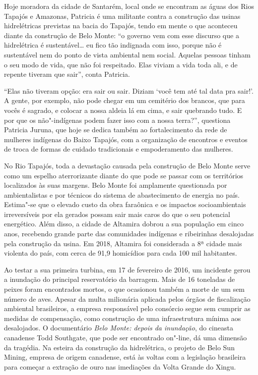 Hoje moradora da cidade de Santarém, local onde se encontram as águas
dos Rios Tapajós e Amazonas, Patricia é uma militante contra a
construção das usinas hidrelétricas previstas na bacia do Tapajós, tendo
em mente o que aconteceu diante da construção de Belo %
Monte: ``o governo vem com esse discurso que a hidrelétrica é
sustentável\ldots{} eu fico tão indignada com isso, porque não é
sustentável nem do ponto de vista ambiental nem social. Aquelas pessoas
tinham o seu modo de vida, que não foi respeitado. Elas viviam a vida
toda ali, e de repente tiveram que sair'', conta Patricia.

``Elas não tiveram opção: era sair ou sair. Diziam `você tem até tal
data pra sair!'. A gente, por exemplo, não pode chegar em um cemitério
dos brancos, que para vocês é sagrado, e colocar a nossa aldeia lá em
cima, e sair quebrando tudo. E por que os não"-indígenas podem fazer isso
com a nossa terra?'', questiona Patricia Juruna, que hoje se dedica também ao
fortalecimento da rede de mulheres indígenas do Baixo Tapajós, com a
organização de encontros e eventos de troca de formas de cuidado
tradicionais e empoderamento das mulheres.

No Rio Tapajós, toda a devastação causada pela construção de Belo Monte
serve como um espelho aterrorizante diante do que pode se passar com os
territórios localizados às suas margens. Belo Monte foi amplamente
questionada por ambientalistas e por técnicos do sistema de
abastecimento de energia no país. Estima"-se que o elevado custo da obra
faraônica e os impactos socioambientais irreversíveis por ela gerados
possam sair mais caros do que o seu potencial energético. Além disso, a
cidade de Altamira dobrou a sua população em cinco anos, recebendo
grande parte das comunidades indígenas e ribeirinhas desalojadas pela
construção da usina. Em 2018, Altamira foi considerada a 8ª cidade mais
violenta do país, com cerca de 91,9 homicídios para cada 100 mil
habitantes.

Ao testar a sua primeira turbina, em 17 de fevereiro de 2016, um
incidente gerou a inundação do principal reservatório da barragem. Mais
de 16 toneladas de peixes foram encontrados mortos, o que ocasionou
também a morte de um sem número de aves. Apesar da multa milionária
aplicada pelos órgãos de fiscalização ambiental brasileiros, a empresa
responsável pelo consórcio segue sem cumprir as medidas de compensação,
como construção de uma infraestrutura mínima aos desalojados. O
documentário \emph{Belo Monte: depois da inundação}, do cineasta canadense Todd
Southgate, que pode ser encontrado on"-line, dá uma dimensão da tragédia.
Na esteira da construção da hidrelétrica, o projeto de Belo Sun Mining,
empresa de origem canadense, está às voltas com a legislação brasileira
para começar a extração de ouro nas imediações da Volta Grande do Xingu.

